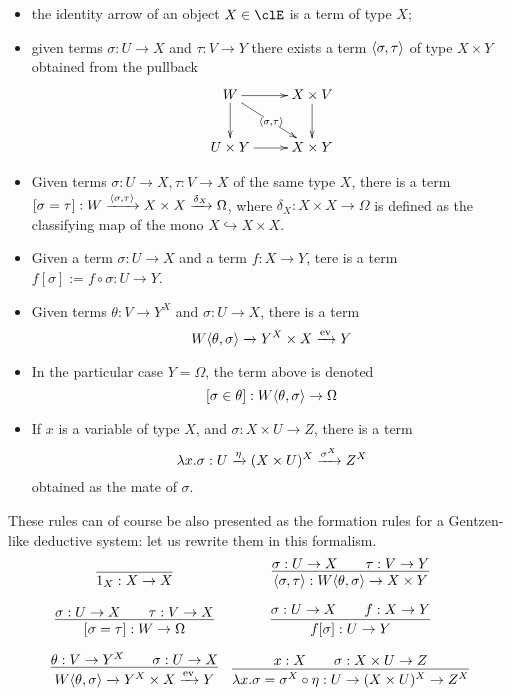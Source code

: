 \begin{itemize}
  \item the identity arrow of an object $X\in\clE$ is a term of type $X$;
  \item given terms $\sigma : U \to X$ and $\tau :  V\to Y$ there exists a term $\langle \sigma,\tau\rangle$ of type $X\times Y$ obtained from the pullback
        \[\xymatrix{
          W \ar[d]\ar[r]\ar[dr]|{\lr{\sigma}{\tau}} & X \times V \ar[d]\\
          U\times Y \ar[r]& X\times Y
          }\]
  \item Given terms $\sigma : U \to X, \tau : V \to X$ of the same type $X$, there is a term $[\sigma = \tau] : W \xrightarrow{\langle \sigma,\tau\rangle} X\times X \xrightarrow{\delta_X} \Omega$, where $\delta_X : X\times X \to \Omega$ is defined as the classifying map of the mono $X \hookrightarrow X\times X$.
  \item Given a term $\sigma : U \to X$ and a term $f : X \to Y$, tere is a term $f[\sigma] := f\circ\sigma : U \to Y$.
  \item Given terms $\theta :  V \to Y^X$ and $\sigma : U\to X$, there is a term
        \[
          W\langle \theta,\sigma\rangle \xrightarrow{}Y^X\times X \xrightarrow{\text{ev}} Y
        \]
  \item In the particular case $Y=\Omega$, the term above is denoted
        \[[\sigma\in\theta] : W\langle \theta,\sigma\rangle \to \Omega\]
  \item If $x$ is a variable of type $X$, and $\sigma : X\times U \to Z$, there is a term
        \[\lambda x.\sigma : U \xrightarrow{\eta} (X\times U)^X \xrightarrow{\sigma^X} Z^X\]
        obtained as the mate of $\sigma$.
\end{itemize}
These rules can of course be also presented as the formation rules for a Gentzen-like deductive system: let us rewrite them in this formalism.
\[ \begin{array}{cc}
    \infer{1_X : X \to X}{}                                                              &
    \infer{\lr{\sigma}{\tau} : W\lr{\theta}{\sigma} \to X \times Y }{\sigma : U \to X    &   & \tau : V \to Y}             \\[1em]
    \infer{[\sigma=\tau] : W \to \Omega}{\sigma : U \to X                                &   & \tau : V \to X}           &
    \infer{f[\sigma] : U \to Y}{\sigma : U \to X                                         &   & f : X \to Y}                \\[1em]
    \infer{W\lr{\theta}{\sigma} \xto{}Y^X\times X \xto{\text{ev}} Y}{\theta :  V \to Y^X &   & \sigma : U\to X}          &
    \infer{\lambda x.\sigma = \sigma^X\circ\eta : U \to (X\times U)^X \to Z^X}{ x: X     &   & \sigma : X\times U \to Z}
  \end{array}\]
